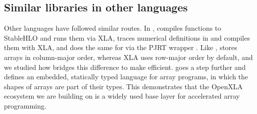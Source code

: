 \documentclass[article,shortnames]{jss}
\begin{document}
\subsection{Similar libraries in other languages}\label{libraries}

Other languages have followed similar routes.
In  \citep{ref-bezanson2017julia},  \citep{ref-reactant} compiles  functions to StableHLO and runs them via XLA,  \citep{ref-nx} traces numerical definitions in  and compiles them with XLA, and  \citep{ref-gomlx} does the same for  via the PJRT wrapper  \citep{ref-gopjrt}.
Like ,  stores arrays in column-major order, whereas XLA uses row-major order by default, and we studied how  bridges this difference to make  efficient.
 \citep{ref-gx} goes a step further and defines an embedded, statically typed language for array programs, in which the shapes of arrays are part of their types.
This demonstrates that the OpenXLA ecosystem we are building on is a widely used base layer for accelerated array programming.
\end{document}
